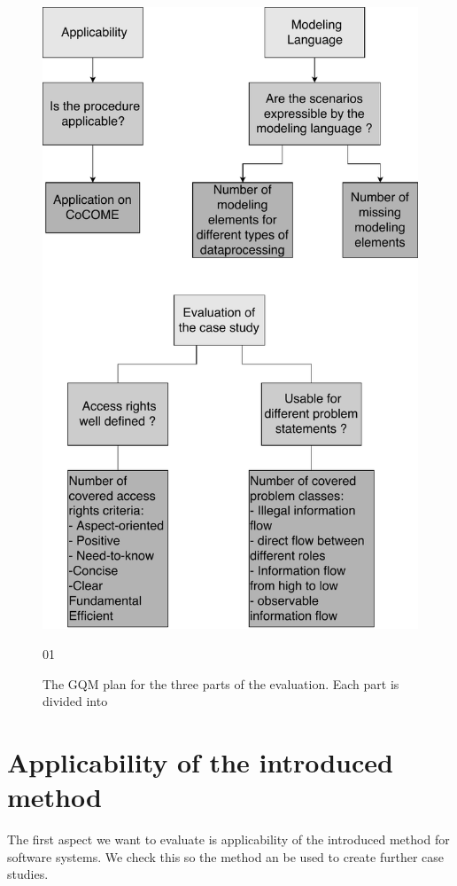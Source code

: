 \begin{figure}
\includegraphics[scale=.8, origin=c ]{logos/OverviewEval.pdf}
\caption{The GQM plan for the three parts of the evaluation. Each part is divided into }01
\label{GQMPlan}
\end{figure}
\section{Applicability of the introduced method}
The first aspect we want to evaluate is applicability of the introduced method for software systems. We check this so the method an be used to create further case studies. 
